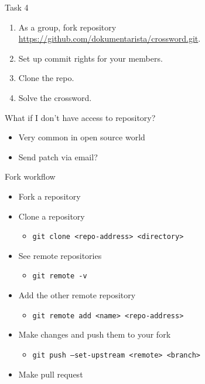 \documentclass[14pt]{beamer}
\begin{document}
	\begin{frame}{Task 4}
	\begin{enumerate}
		\item As a group, fork repository \\ {\small \url{https://github.com/dokumentarista/crossword.git}}.
		\item Set up commit rights for your members.
		\item Clone the repo.
		\item Solve the crossword.
	\end{enumerate}
	
\end{frame}


	\begin{frame}{What if I don't have access to repository?}
	\begin{itemize}
		\item Very common in open source world
		\item Send patch via email?
	\end{itemize}
	\end{frame}

	\begin{frame}{Fork workflow}
	\begin{itemize}
		\item Fork a repository
		\item Clone a repository
	        \begin{itemize}
		    \item \texttt{git clone <repo-address> <directory>}
	        \end{itemize}
		\item See remote repositories
	        \begin{itemize}
		    \item \texttt{git remote -v}
	        \end{itemize}
		\item Add the other remote repository
	        \begin{itemize}
		    \item \texttt{git remote add <name> <repo-address>}
	        \end{itemize}
		\item Make changes and push them to your fork
	        \begin{itemize}
		    \item \texttt{git push --set-upstream <remote> <branch>}
	        \end{itemize}
		\item Make pull request
	\end{itemize}
	\end{frame}
\end{document}
